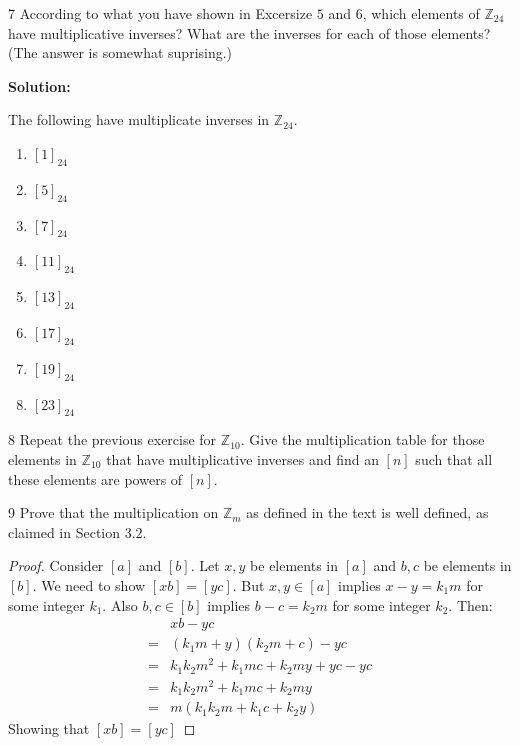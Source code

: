 \begin{problem}{7}
    According to what you have shown in Excersize $5$ and $6$, which 
    elements of $\mathbb{Z}_{24}$ have multiplicative inverses?
    What are the inverses for each of those elements? (The answer is somewhat suprising.)
\end{problem}
\solved

\textbf{Solution:}

The following have multiplicate inverses in $\mathbb{Z}_{24}$.

\begin{enumerate}
    \item $[1]_{24}$
    \item $[5]_{24}$
    \item $[7]_{24}$
    \item $[11]_{24}$
    \item $[13]_{24}$
    \item $[17]_{24}$
    \item $[19]_{24}$
    \item $[23]_{24}$
\end{enumerate}

\begin{problem}{8}
    Repeat the previous exercise for $\mathbb{Z}_{10}$. Give the multiplication table for
    those elements in $\mathbb{Z}_{10}$ that have multiplicative inverses and find an
    $[n]$ such that all these elements are powers of $[n]$.
\end{problem}
\unsolved

\begin{problem}{9}
    Prove that the multiplication on $\mathbb{Z}_m$ as defined in the text 
    is well defined, as claimed in Section $3.2$.
\end{problem}
\solved

\begin{proof}
    Consider $[a]$ and $[b]$.
    Let $x, y$ be elements in $[a]$ and $b, c$ be elements in $[b]$.
    We need to show $[xb] = [yc]$.
    But $x,y \in [a]$ implies $x - y = k_1 m$ for some integer $k_1$.
    Also $b, c \in [b]$ implies $b - c = k_2 m$ for some integer $k_2$.
    Then:
    \begin{align*}
        &xb - yc  \\
        =&(k_1 m + y)(k_2 m + c) - yc  \\
        =&k_1 k_2 m^2 + k_1 mc + k_2 my + yc - yc  \\
        =&k_1 k_2 m^2 + k_1 mc + k_2 my  \\
        =&m(k_1 k_2 m + k_1 c + k_2 y)
    \end{align*}
    Showing that $[xb]=[yc]$
\end{proof}


